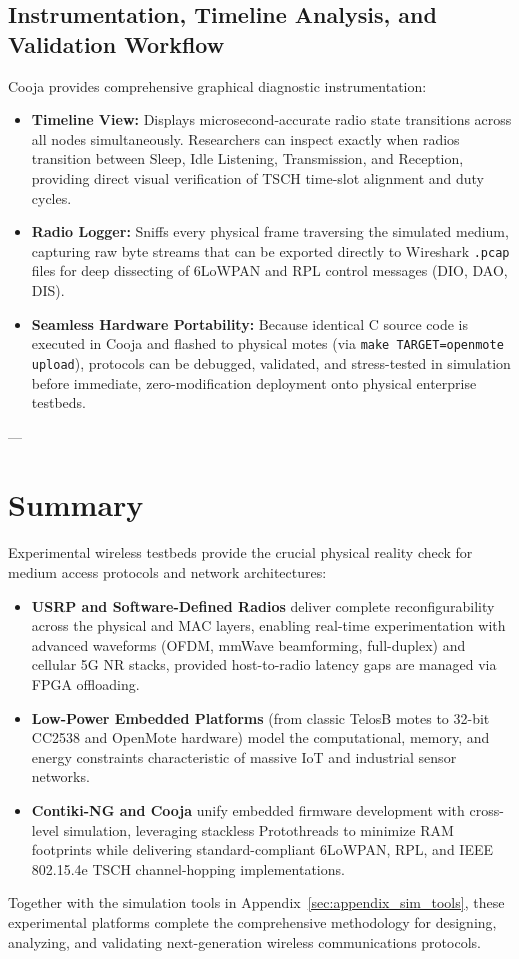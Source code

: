 \subsection{Instrumentation, Timeline Analysis, and Validation Workflow}
Cooja provides comprehensive graphical diagnostic instrumentation:
\begin{itemize}
    \item \textbf{Timeline View:} Displays microsecond-accurate radio state transitions across all nodes simultaneously. Researchers can inspect exactly when radios transition between Sleep, Idle Listening, Transmission, and Reception, providing direct visual verification of TSCH time-slot alignment and duty cycles.
    \item \textbf{Radio Logger:} Sniffs every physical frame traversing the simulated medium, capturing raw byte streams that can be exported directly to Wireshark \texttt{.pcap} files for deep dissecting of 6LoWPAN and RPL control messages (DIO, DAO, DIS).
    \item \textbf{Seamless Hardware Portability:} Because identical C source code is executed in Cooja and flashed to physical motes (via \texttt{make TARGET=openmote upload}), protocols can be debugged, validated, and stress-tested in simulation before immediate, zero-modification deployment onto physical enterprise testbeds.
\end{itemize}

---

\section{Summary}
\label{sec:appendix_testbeds_summary}

Experimental wireless testbeds provide the crucial physical reality check for medium access protocols and network architectures:
\begin{itemize}
    \item \textbf{USRP and Software-Defined Radios} deliver complete reconfigurability across the physical and MAC layers, enabling real-time experimentation with advanced waveforms (OFDM, mmWave beamforming, full-duplex) and cellular 5G NR stacks, provided host-to-radio latency gaps are managed via FPGA offloading.
    \item \textbf{Low-Power Embedded Platforms} (from classic TelosB motes to 32-bit CC2538 and OpenMote hardware) model the computational, memory, and energy constraints characteristic of massive IoT and industrial sensor networks.
    \item \textbf{Contiki-NG and Cooja} unify embedded firmware development with cross-level simulation, leveraging stackless Protothreads to minimize RAM footprints while delivering standard-compliant 6LoWPAN, RPL, and IEEE 802.15.4e TSCH channel-hopping implementations.
\end{itemize}
Together with the simulation tools in Appendix~\ref{sec:appendix_sim_tools}, these experimental platforms complete the comprehensive methodology for designing, analyzing, and validating next-generation wireless communications protocols.
